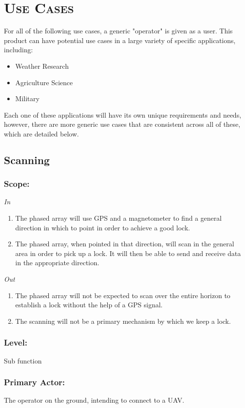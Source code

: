 \documentclass[ProductRequirements.tex]{subfiles}
\begin{document}
\bigskip

\section{\textsc{\Large Use Cases}}	
	For all of the following use cases, a generic "operator" is given as a user. This product can have potential use cases in a large variety of specific applications, including: 
	\begin{itemize}
		\item Weather Research
		\item Agriculture Science
		\item Military
	\end{itemize}
	Each one of these applications will have its own unique requirements and needs, however, there are more generic use cases that are consistent across all of these, which are detailed below.
	\subsection{Scanning}
		\subsubsection*{Scope:}
			\textit{In}
			\begin{enumerate}
				\item The phased array will use GPS and a magnetometer to find a general direction in which to point in order to achieve a good lock.
				\item The phased array, when pointed in that direction, will scan in the general area in order to pick up a lock. It will then be able to send and receive data in the appropriate direction.
			\end{enumerate}
			\textit{Out}
			\begin{enumerate}
				\item The phased array will not be expected to scan over the entire horizon to establish a lock without the help of a GPS signal.
				\item The scanning will not be a primary mechanism by which we keep a lock.
			\end{enumerate}
		\subsubsection*{Level:}
			Sub function
		\subsubsection*{Primary Actor:}
			The operator on the ground, intending to connect to a UAV.
\end{document}
